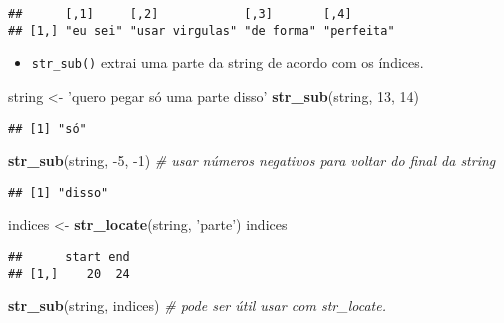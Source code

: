 \documentclass[]{book}
\newenvironment{Shaded}{\begin{snugshade}}{\end{snugshade}}
\newcommand{\KeywordTok}[1]{\textcolor[rgb]{0.13,0.29,0.53}{\textbf{{#1}}}}
\newcommand{\DecValTok}[1]{\textcolor[rgb]{0.00,0.00,0.81}{{#1}}}
\newcommand{\StringTok}[1]{\textcolor[rgb]{0.31,0.60,0.02}{{#1}}}
\newcommand{\CommentTok}[1]{\textcolor[rgb]{0.56,0.35,0.01}{\textit{{#1}}}}
\newcommand{\NormalTok}[1]{{#1}}
\providecommand{\tightlist}{%
  \setlength{\itemsep}{0pt}\setlength{\parskip}{0pt}}
\begin{document}
\begin{verbatim}
##      [,1]     [,2]            [,3]       [,4]      
## [1,] "eu sei" "usar virgulas" "de forma" "perfeita"
\end{verbatim}

\begin{itemize}
\tightlist
\item
  \texttt{str\_sub()} extrai uma parte da string de acordo com os
  índices.
\end{itemize}

\begin{Shaded}
\begin{Highlighting}[]
\NormalTok{string <-}\StringTok{ 'quero pegar só uma parte disso'}
\KeywordTok{str_sub}\NormalTok{(string, }\DecValTok{13}\NormalTok{, }\DecValTok{14}\NormalTok{)}
\end{Highlighting}
\end{Shaded}

\begin{verbatim}
## [1] "só"
\end{verbatim}

\begin{Shaded}
\begin{Highlighting}[]
\KeywordTok{str_sub}\NormalTok{(string, -}\DecValTok{5}\NormalTok{, -}\DecValTok{1}\NormalTok{) }\CommentTok{# usar números negativos para voltar do final da string}
\end{Highlighting}
\end{Shaded}

\begin{verbatim}
## [1] "disso"
\end{verbatim}

\begin{Shaded}
\begin{Highlighting}[]
\NormalTok{indices <-}\StringTok{ }\KeywordTok{str_locate}\NormalTok{(string, }\StringTok{'parte'}\NormalTok{)}
\NormalTok{indices}
\end{Highlighting}
\end{Shaded}

\begin{verbatim}
##      start end
## [1,]    20  24
\end{verbatim}

\begin{Shaded}
\begin{Highlighting}[]
\KeywordTok{str_sub}\NormalTok{(string, indices) }\CommentTok{# pode ser útil usar com str_locate.}
\end{Highlighting}
\end{Shaded}
\end{document}
